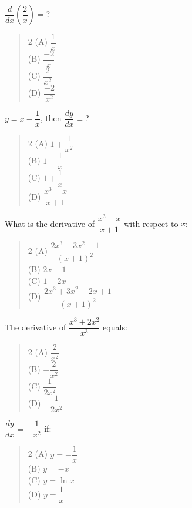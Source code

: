 \documentclass[11pt,a4paper]{article}
\begin{document}
\begin{mcqlist}
\item $\dfrac{d}{dx}\left(\dfrac{2}{x}\right) = $?
\begin{quote}\begin{multicols}{2}
\noindent (A) $\dfrac{1}{x}$ \\
(B) $\dfrac{-2}{x}$ \\
(C) $\dfrac{2}{x^2}$ \\
(D) $\dfrac{-2}{x^2}$
\end{multicols}\end{quote}

\item $y=x-\dfrac{1}{x}$, then $\dfrac{dy}{dx} = $?
\begin{quote}\begin{multicols}{2}
\noindent (A) $1+\dfrac{1}{x^2}$ \\
(B) $1-\dfrac{1}{x}$ \\
(C) $1+\dfrac{1}{x}$ \\
(D) $\dfrac{x^3-x}{x+1}$
\end{multicols}\end{quote}

\item What is the derivative of $\dfrac{x^3-x}{x+1}$ with respect to $x$:
\begin{quote}\begin{multicols}{2}
\noindent (A) $\dfrac{2x^3+3x^2-1}{(x+1)^2}$ \\
(B) $2x-1$ \\
(C) $1-2x$ \\
(D) $\dfrac{2x^3+3x^2-2x+1}{(x+1)^2}$
\end{multicols}\end{quote}

\item The derivative of $\dfrac{x^3+2x^2}{x^3}$ equals:
\begin{quote}\begin{multicols}{2}
\noindent (A) $\dfrac{2}{x^2}$ \\
(B) $-\dfrac{2}{x^2}$ \\
(C) $\dfrac{1}{2x^2}$ \\
(D) $-\dfrac{1}{2x^2}$
\end{multicols}\end{quote}

\item $\dfrac{dy}{dx} = -\dfrac{1}{x^2}$ if:
\begin{quote}\begin{multicols}{2}
\noindent (A) $y=-\dfrac{1}{x}$ \\
(B) $y=-x$ \\
(C) $y=\ln x$ \\
(D) $y=\dfrac{1}{x}$
\end{multicols}\end{quote}


\end{mcqlist}
\end{document}
